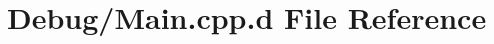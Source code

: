 \hypertarget{_debug_2_main_8cpp_8d}{\section{\-Debug/\-Main.cpp.\-d \-File \-Reference}
\label{_debug_2_main_8cpp_8d}
}
